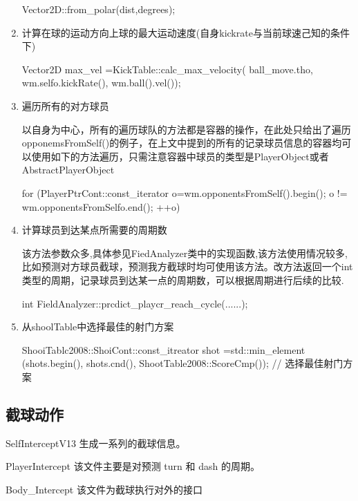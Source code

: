 \begin{enumerate}
\begin{Code}
	Vector2D::from_polar(dist,degrees);
\end{Code}

	\item 计算在球的运动方向上球的最大运动速度(自身kickrate与当前球速己知的条件下) 
	
\begin{Code}
	Vector2D max_vel
		=KickTable::calc_max_velocity( ball_move.tho,
				wm.selfo.kickRate(),
				wm.ball().vel());
\end{Code}


	\item 遍历所有的对方球员

以自身为中心，所有的遍历球队的方法都是容器的操作，在此处只给出了遍历opponemsFromSelf()的例子，在上文中提到的所有的记录球员信息的容器均可以使用如下的方法遍历，只需注意容器中球员的类型是PlayerObject或者AbstractPlayerObject
\begin{Code}
	for (PlayerPtrCont::const_iterator o=wm.opponentsFromSelf().begin();
		o != wm.opponentsFromSelfo.end();
		++o)
\end{Code}


	\item 计算球员到达某点所需要的周期数

该方法参数众多,具体参见FiedAnalyzer类中的实现函数,该方法使用情况较多,比如预测对方球员截球，预测我方截球时均可使用该方法。改方法返回一个int类型的周期，记录球员到达某一点的周期数，可以根据周期进行后续的比较.
\begin{Code}
	int FieldAnalyzer::prcdict_playcr_reach_cycle(......);	
\end{Code}

	\item 从shoolTable中选择最佳的射门方案
\begin{Code}
	ShooiTablc2008::ShoiCont::const_itreator shot
	=std::min_element (shots.begin(),
			shots.cnd(),
			ShootTable2008::ScoreCmp()); // 选择最佳射门方案 
\end{Code}

\end{enumerate}
\subsection{截球动作}

SelfInterceptV13 	生成一系列的截球信息。

PlayerIntercept 	该文件主要是对预测 turn 和 dash 的周期。

Body_Intercept 		该文件为截球执行对外的接口

